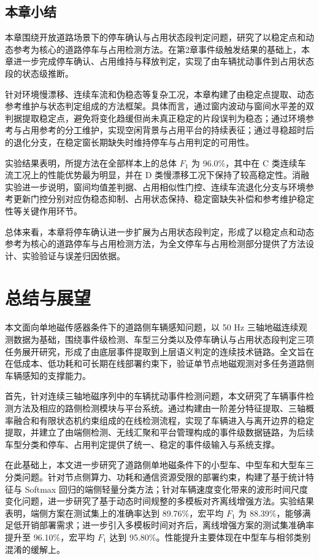 \documentclass{xdupgthesis}
\begin{document}
\section{本章小结}
\label{sec:ch4_summary}

本章围绕开放道路场景下的停车确认与占用状态段判定问题，研究了以稳定点和动态参考为核心的道路停车与占用检测方法。在第2章事件级触发结果的基础上，本章进一步完成停车确认、占用维持与释放判定，实现了由车辆扰动事件到占用状态段的状态级推断。

针对环境慢漂移、连续车流和伪稳态等复杂工况，本章构建了由稳定点提取、动态参考维护与状态判定组成的方法框架。具体而言，通过窗内波动与窗间水平差的双判据提取稳定点，避免将变化趋缓但尚未真正稳定的片段误判为稳态；通过环境参考与占用参考的分工维护，实现空闲背景与占用平台的持续表征；通过寻稳超时后的退化分支，在稳定窗长期缺失时维持停车与占用判定的可用性。

实验结果表明，所提方法在全部样本上的总体 $F_1$ 为 96.0\%，其中在 C 类连续车流工况上的性能优势最为明显，并在 D 类慢漂移工况下保持了较高稳定性。消融实验进一步说明，窗间均值差判据、占用相似性门控、连续车流退化分支与环境参考更新门控分别对应伪稳态抑制、占用状态保持、稳定窗缺失补偿和参考维护稳定性等关键作用环节。

总体来看，本章将停车确认进一步扩展为占用状态段判定，形成了以稳定点和动态参考为核心的道路停车与占用检测方法，为全文停车与占用检测部分提供了方法设计、实验验证与误差归因依据。




\chapter{总结与展望}

本文面向单地磁传感器条件下的道路侧车辆感知问题，以 50 Hz 三轴地磁连续观测数据为基础，围绕事件级检测、车型三分类以及停车确认与占用状态段判定三项任务展开研究，形成了由底层事件提取到上层语义判定的连续技术链路。全文旨在在低成本、低功耗和可长期在线部署约束下，验证单节点地磁观测对多任务道路侧车辆感知的支撑能力。

首先，针对连续三轴地磁序列中的车辆扰动事件检测问题，本文研究了车辆事件检测方法及相应的路侧检测模块与平台系统。通过构建由一阶差分特征提取、三轴概率融合和有限状态机约束组成的在线检测流程，实现了车辆进入与离开边界的稳定提取，并建立了由端侧检测、无线汇聚和平台管理构成的事件级数据链路，为后续车型分类和停车、占用判定提供了统一、稳定的事件级输入与系统支撑。

在此基础上，本文进一步研究了道路侧单地磁条件下的小型车、中型车和大型车三分类问题。针对节点侧算力、功耗和通信资源受限的部署约束，构建了基于统计特征与 Softmax 回归的端侧轻量分类方法；针对车辆速度变化带来的波形时间尺度变化问题，进一步研究了基于动态时间规整的多模板对齐离线增强方法。实验结果表明，端侧方案在测试集上的准确率达到 89.76\%，宏平均 $F_1$ 为 88.39\%，能够满足低开销部署需求；进一步引入多模板时间对齐后，离线增强方案的测试集准确率提升至 96.10\%，宏平均 $F_1$ 达到 95.80\%。性能提升主要体现在中型车与相邻类别混淆的缓解上。
\end{document}
